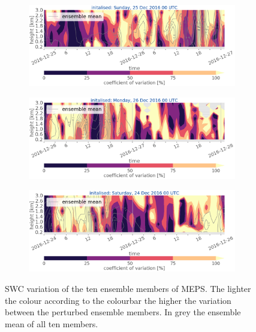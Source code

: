 \begin{figure}[t]\ContinuedFloat
	\centering
		\begin{subfigure}[t]{\textwidth}		\includegraphics[trim={0.cm 5.3cm 0cm 0cm},clip,width=\textwidth]{./fig_variation/20161225}
			\caption{}\label{fig:ens_vari25}
		\end{subfigure}
		\begin{subfigure}[t]{\textwidth}		\includegraphics[trim={0.cm 5.3cm 0cm 0cm},clip,width=\textwidth]{./fig_variation/20161226}
			\caption{}\label{fig:ens_vari26}
		\end{subfigure}
        
     	\begin{subfigure}[t]{\textwidth}		\includegraphics[trim={15.cm 0cm 15cm 21cm},clip,width=\textwidth]{./fig_variation/20161224}
		\end{subfigure}
        \caption{SWC variation of the ten ensemble members of MEPS. The lighter the colour according to the colourbar the higher the variation between the perturbed ensemble members. In grey the ensemble mean of all ten members.}\label{fig:ens_vari}
\end{figure}

